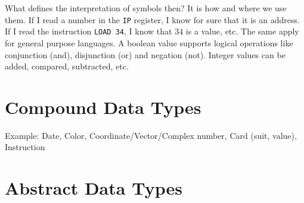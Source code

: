 \documentclass{aldast}
\begin{document}
What defines the interpretation of symbols then? It is how and where
we use them. If I read a number in the \texttt{IP} register, I know
for sure that it is an address. If I read the instruction \texttt{LOAD
  34}, I know that $34$ is a value, etc. The same apply for general
purpose languages. A boolean value supports logical operations like
conjunction (and), disjunction (or) and negation (not). Integer values
can be added, compared, subtracted, etc.

\section{Compound Data Types}

Example: Date, Color, Coordinate/Vector/Complex number, Card (suit, value), Instruction



\section{Abstract Data Types}


     






\end{document}
